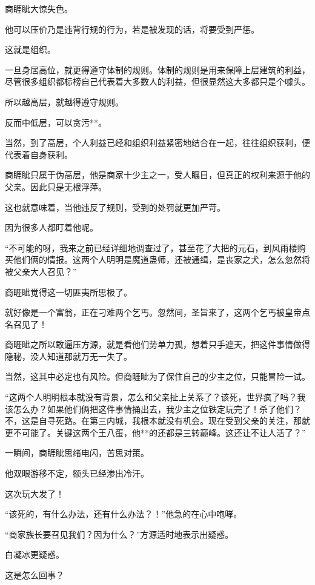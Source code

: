 
\begin{this_body}

商睚眦大惊失色。

他可以压价乃是违背行规的行为，若是被发现的话，将要受到严惩。

这就是组织。

一旦身居高位，就更得遵守体制的规则。体制的规则是用来保障上层建筑的利益，尽管很多组织都标榜自己代表着大多数人的利益，但很显然这大多都只是个噱头。

所以越高层，就越得遵守规则。

反而中低层，可以贪污**。

当然，到了高层，个人利益已经和组织利益紧密地结合在一起，往往组织获利，便代表着自身获利。

商睚眦只属于伪高层，他是商家十少主之一，受人瞩目，但真正的权利来源于他的父亲。因此只是无根浮萍。

这也就意味着，当他违反了规则，受到的处罚就更加严苛。

因为很多人都盯着他呢。

“不可能的呀，我来之前已经详细地调查过了，甚至花了大把的元石，到风雨楼购买他们俩的情报。这两个人明明是魔道蛊师，还被通缉，是丧家之犬，怎么忽然将被父亲大人召见？”

商睚眦觉得这一切匪夷所思极了。

就好像是一个富翁，正在刁难两个乞丐。忽然间，圣旨来了，这两个乞丐被皇帝点名召见了！

商睚眦之所以敢逼压方源，就是看他们势单力孤，想着只手遮天，把这件事情做得隐秘，没人知道那就万无一失了。

当然，这其中必定也有风险。但商睚眦为了保住自己的少主之位，只能冒险一试。

“这两个人明明根本就没有背景，怎么和父亲扯上关系了？该死，世界疯了吗？我该怎么办？如果他们俩把这件事情捅出去，我少主之位铁定玩完了！杀了他们？不，这是自寻死路。在第三内城，我根本就没有机会。现在受到父亲的关注，那就更不可能了。关键这两个王八蛋，他**的还都是三转巅峰。这还让不让人活了？”

一瞬间，商睚眦思绪电闪，苦思对策。

他双眼游移不定，额头已经渗出冷汗。

这次玩大发了！

“该死的，有什么办法，还有什么办法？！”他急的在心中咆哮。

“商家族长要召见我们？因为什么？”方源适时地表示出疑惑。

白凝冰更疑惑。

这是怎么回事？


\end{this_body}
